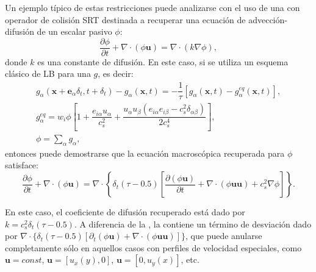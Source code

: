 Un ejemplo t\'ipico de estas restricciones puede analizarse con el uso de una \lbe{} con operador de colisi\'on SRT destinada a recuperar una ecuaci\'on de advecci\'on-difusi\'on de un escalar pasivo $\phi$:
\begin{equation}
	\dfrac{\partial \phi}{\partial t} + \nabla \cdot (\phi \bm{u}) = \nabla \cdot (k \nabla \phi),
	\label{eq:adv_dif_phi}
\end{equation}
donde $k$ es una constante de difusi\'on. En este caso, si se utiliza un esquema cl\'asico de LB para una \fdp{} $g$, es decir:
\begin{equation}
	\begin{gathered}
		g_{\alpha}(\bm{x}+\bm{e}_{\alpha}\delta_t, t+\delta_t) - g_{\alpha}(\bm{x},t) = -\dfrac{1}{\tau} \left[ g_{\alpha}(\bm{x},t) - g^{eq}_{\alpha}(\bm{x},t) \right], \\[2mm]
		g_{\alpha}^{eq} = w_i \phi \left[ 1 + \dfrac{e_{i\alpha}u_{\alpha}}{c_s^2} + \dfrac{u_{\alpha}u_{\beta}(e_{i\alpha}e_{i\beta}-c_s^2\delta_{\alpha\beta})}{2c_s^4} \right], \\[2mm]
		\phi = \sum_{\alpha} g_{\alpha},
	\end{gathered}
\end{equation}
entonces puede demostrarse que la ecuaci\'on macrosc\'opica recuperada para $\phi$ satisface:
\begin{equation}
	\dfrac{\partial \phi}{\partial t} + \nabla \cdot (\phi \bm{u}) = \nabla \cdot \left\{ \delta_t(\tau - 0.5) \left[ \dfrac{\partial (\phi\bm{u})}{\partial t} + \nabla \cdot (\phi \bm{uu}) + c_s^2 \nabla \phi\right]\right\}.
	\label{eq:adv_dif_phi_rec}
\end{equation}

En este caso, el coeficiente de difusi\'on recuperado est\'a dado por $k=c_s^2 \delta_t(\tau-0.5)$. A diferencia de la , la  contiene un t\'ermino de desviaci\'on dado por $\nabla \cdot \{ \delta_t(\tau - 0.5) [ \partial_t (\phi\bm{u}) + \nabla \cdot (\phi \bm{uu}) ]\}$, que puede anularse completamente s\'olo en aquellos casos con perfiles de velocidad especiales, como $\bm{u}=const$, $\bm{u}=[u_x(y),0]$, $\bm{u}=[0,u_y(x)]$, etc. 

